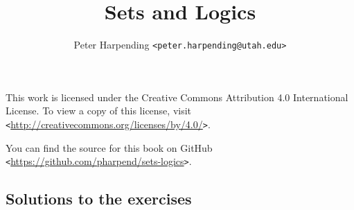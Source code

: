 \documentclass[12pt,oneside,ebook]{memoir}
\newcommand{\monospace}[1]{{\footnotesize \texttt{#1}}}
\newcommand{\btrurl}[1]{{\tiny \url{#1}}}
\newcommand{\barelink}[1]{\monospace{<}\btrurl{#1}\monospace{>}}
\newcommand{\anauthor}[2]{#1 \monospace{<{#2}>}}
\theoremstyle{definition}
\begin{document}
\title{Sets and Logics}
\author{\anauthor{Peter Harpending}{peter.harpending@utah.edu}}
\maketitle

This work is licensed under the Creative Commons Attribution 4.0
International License. To view a copy of this license, visit
\barelink{http://creativecommons.org/licenses/by/4.0/}.

You can find the source for this book on GitHub
\barelink{https://github.com/pharpend/sets-logics}.

\newpage
\tableofcontents



\begin{appendices}
  \chapter{Solutions to the exercises}
  \shipoutAnswer
\end{appendices}

\printbibliography
\end{document}
